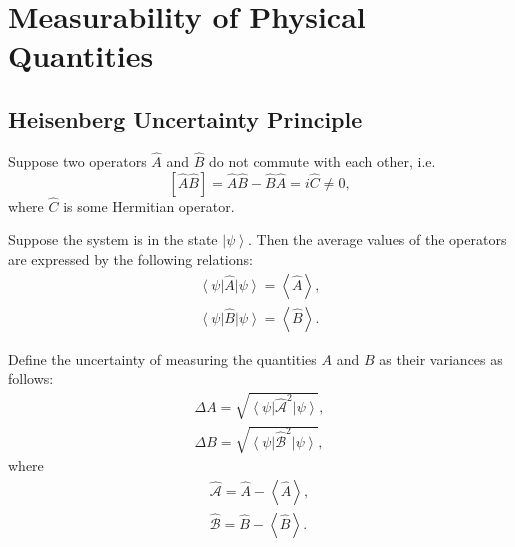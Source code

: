\section{Measurability of Physical Quantities}
\subsection{Heisenberg Uncertainty Principle}
\label{AddHeisenbergUncertaintyPrinciple}
Suppose two operators $\hat{A}$ and $\hat{B}$ do not commute with each other, i.e. 
\begin{equation}
\left[
\hat{A}\hat{B}
\right] = 
\hat{A}\hat{B} - \hat{B}\hat{A} = i \hat{C} \ne 0,
\nonumber
\end{equation}
where $\hat{C}$ is some Hermitian operator.

Suppose the system is in the state $\left|\psi\right>$. Then the average values of the operators are expressed by the following relations:
\begin{eqnarray}
\left<\psi\right|\hat{A}\left|\psi\right> = \left<\hat{A}\right>,
\nonumber \\
\left<\psi\right|\hat{B}\left|\psi\right> = \left<\hat{B}\right>.
\nonumber
\end{eqnarray}

Define the uncertainty of measuring the quantities $A$ and $B$ as their variances as follows:
\begin{eqnarray}
\Delta A = \sqrt{\left<\psi\right|
\hat{\mathcal{A}}^2\left|\psi\right>}, 
\nonumber \\
\Delta B = \sqrt{\left<\psi\right|
\hat{\mathcal{B}}^2\left|\psi\right>}, 
\nonumber
\end{eqnarray}
where
\begin{eqnarray}
\hat{\mathcal{A}} = \hat{A}-\left<\hat{A}\right>, 
\nonumber \\
\hat{\mathcal{B}} = \hat{B}-\left<\hat{B}\right>.
\nonumber
\end{eqnarray}

